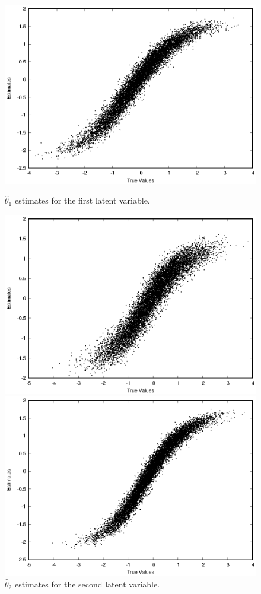 \begin{figure}[h!]
\includegraphics[width=\textwidth]{img/ijcnn_results/10k_t1_scaled.eps}
\caption{$\hat{\theta}_1$ estimates for the first latent variable.}
\label{fig:10kt1}
\endminipage\hfill
{}
\includegraphics[width=\textwidth]{img/ijcnn_results/10k_t2_scaled.eps}
\caption{$\hat{\theta}_2$ estimates for the second latent variable.}
\label{fig:10kt2}
\endminipage\hfill
\linebreak
{}
\includegraphics[width=\textwidth]{img/ijcnn_results/10k_t3_scaled.eps}

\end{figure}
